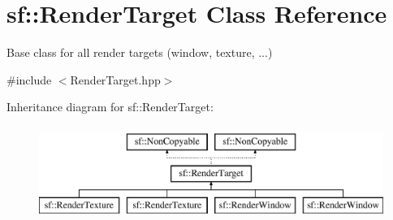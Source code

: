 \hypertarget{classsf_1_1_render_target}{\section{sf\-:\-:Render\-Target Class Reference}
\label{classsf_1_1_render_target}
}


Base class for all render targets (window, texture, ...)  




{\ttfamily \#include $<$Render\-Target.\-hpp$>$}

Inheritance diagram for sf\-:\-:Render\-Target\-:\begin{figure}[H]
\begin{center}
\leavevmode
\includegraphics[height=3.000000cm]{classsf_1_1_render_target}
\end{center}
\end{figure}
